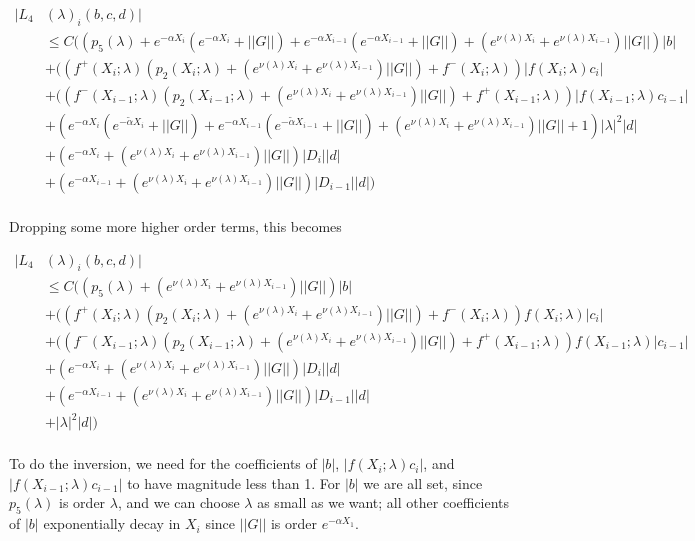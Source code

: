 \documentclass[12pt]{article}
\begin{document}
\begin{enumerate}
\begin{align*}
|L_4&(\lambda)_i(b, c, d)|\\ 
&\leq C\Big(( p_5(\lambda) + e^{-\alpha X_i}( e^{-\alpha X_i} + ||G||) + e^{-\alpha X_{i-1}}( e^{-\alpha X_{i-1}} + ||G||) + (e^{\nu(\lambda)X_i} + e^{\nu(\lambda)X_{i-1}}) ||G|| )|b| \\ 
&+ ((f^+(X_i; \lambda) (p_2(X_i; \lambda) + (e^{\nu(\lambda)X_i} + e^{\nu(\lambda)X_{i-1}})||G||) + f^-(X_i; \lambda) ) | f(X_i; \lambda) c_i| \\
&+ ((f^-(X_{i-1}; \lambda) (p_2(X_{i-1}; \lambda) + (e^{\nu(\lambda)X_i} + e^{\nu(\lambda)X_{i-1}})||G||) + f^+(X_{i-1}; \lambda) ) | f(X_{i-1}; \lambda) c_{i-1}| \\
&+ ( e^{-\alpha X_i}(e^{-\tilde{\alpha} X_i} + ||G||) + e^{-\alpha X_{i-1}}(e^{-\tilde{\alpha} X_{i-1}} + ||G||) + (e^{\nu(\lambda)X_i} + e^{\nu(\lambda)X_{i-1}}) ||G|| + 1) |\lambda|^2 |d| \\ 
&+ (e^{-\alpha X_i} + (e^{\nu(\lambda)X_i} + e^{\nu(\lambda)X_{i-1}}) ||G|| ) |D_i||d| \\
&+ (e^{-\alpha X_{i-1}} + (e^{\nu(\lambda)X_i} + e^{\nu(\lambda)X_{i-1}}) ||G|| ) |D_{i-1}||d|\Big)  \\
\end{align*}

Dropping some more higher order terms, this becomes

\begin{align*}
|L_4&(\lambda)_i(b, c, d)|\\ 
&\leq C\Big(( p_5(\lambda) + (e^{\nu(\lambda)X_i} + e^{\nu(\lambda)X_{i-1}}) ||G|| )|b| \\ 
&+ ((f^+(X_i; \lambda) (p_2(X_i; \lambda) + (e^{\nu(\lambda)X_i} + e^{\nu(\lambda)X_{i-1}})||G||) + f^-(X_i; \lambda) ) f(X_i; \lambda) |c_i| \\
&+ ((f^-(X_{i-1}; \lambda) (p_2(X_{i-1}; \lambda) + (e^{\nu(\lambda)X_i} + e^{\nu(\lambda)X_{i-1}})||G||) + f^+(X_{i-1}; \lambda) ) f(X_{i-1}; \lambda) |c_{i-1}| \\
&+ (e^{-\alpha X_i} + (e^{\nu(\lambda)X_i} + e^{\nu(\lambda)X_{i-1}}) ||G|| ) |D_i||d| \\
&+ (e^{-\alpha X_{i-1}} + (e^{\nu(\lambda)X_i} + e^{\nu(\lambda)X_{i-1}}) ||G|| ) |D_{i-1}||d| \\
&+ |\lambda|^2 |d| \Big) \\
\end{align*}

To do the inversion, we need for the coefficients of $|b|$, $|f(X_i; \lambda) c_i|$, and $|f(X_{i-1}; \lambda) c_{i-1}|$ to have magnitude less than 1. For $|b|$ we are all set, since $p_5(\lambda)$ is order $\lambda$, and we can choose $\lambda$ as small as we want; all other coefficients of $|b|$ exponentially decay in $X_i$ since $||G||$ is order $e^{-\alpha X_1}$. \\


\end{enumerate}
\end{document}

